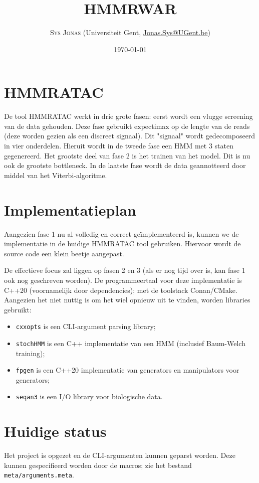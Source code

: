 \documentclass[twoside,twocolumn]{article}
\title{HMMRWAR} %
\author{\textsc{Sys Jonas} (\normalsize Universiteit Gent, \normalsize \href{mailto:Jonas.Sys@UGent.be}{Jonas.Sys@UGent.be})
}
\date{\today} %
\begin{document}
\maketitle

\section{HMMRATAC}

De tool HMMRATAC werkt in drie grote fasen: eerst wordt een vlugge screening van de data gehouden. Deze fase gebruikt expectimax op de lengte van de reads (deze worden gezien als een discreet signaal). Dit "signaal" wordt gedecomposeerd in vier onderdelen. Hieruit wordt in de tweede fase een HMM met 3 staten gegenereerd. Het grootste deel van fase 2 is het trainen van het model. Dit is nu ook de grootste bottleneck. In de laatste fase wordt de data geannotteerd door middel van het Viterbi-algoritme.

\section{Implementatieplan}
Aangezien fase 1 nu al volledig en correct ge\"implementeerd is, kunnen we de implementatie in de huidige HMMRATAC tool gebruiken. Hiervoor wordt de source code een klein beetje aangepast.

De effectieve focus zal liggen op fasen 2 en 3 (als er nog tijd over is, kan fase 1 ook nog geschreven worden). De programmeertaal voor deze implementatie is C++20 (voornamelijk door dependencies); met de toolstack Conan/CMake. Aangezien het niet nuttig is om het wiel opnieuw uit te vinden, worden libraries gebruikt:
\begin{itemize}
  \item \verb|cxxopts| is een CLI-argument parsing library;
  \item \verb|stochHMM| is een C++ implementatie van een HMM (inclusief Baum-Welch training);
  \item \verb|fpgen| is een C++20 implementatie van generators en manipulators voor generators;
  \item \verb|seqan3| is een I/O library voor biologische data.
\end{itemize}

\section{Huidige status}
Het project is opgezet en de CLI-argumenten kunnen geparst worden. Deze kunnen gespecifieerd worden door de macros; zie het bestand \verb|meta/arguments.meta|.
\end{document}
